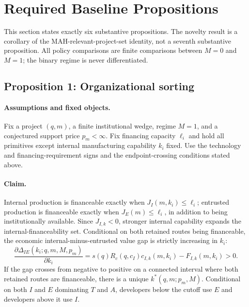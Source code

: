 \section{Required Baseline Propositions}
\label{sec:p08-propositions}

This section states exactly six substantive propositions. The novelty result
is a corollary of the MAH-relevant-project-set identity, not a seventh
substantive proposition. All policy comparisons are finite comparisons between
\(M=0\) and \(M=1\); the binary regime is never differentiated.

\subsection{Proposition 1: Organizational sorting}
\label{prop:p08-sorting}

\paragraph{Assumptions and fixed objects.}
Fix a project \((q,m)\), a finite institutional wedge, regime \(M=1\), and a
conjectured support price \(p_m<\infty\). Fix financing capacity \(\ell_i\)
and hold all primitives except internal manufacturing capability \(k_i\)
fixed. Use the technology and financing-requirement signs and the
endpoint-crossing conditions stated above.

\paragraph{Claim.}
Internal production is financeable exactly when
\(J_I(m,k_i)\leq\ell_i\); entrusted production is financeable exactly when
\(J_E(m)\leq\ell_i\), in addition to being institutionally available. Since
\(J_{I,k}<0\), stronger internal capability expands the internal-financeability
set. Conditional on both retained routes being financeable, the economic
internal-minus-entrusted value gap is strictly increasing in \(k_i\):
\begin{equation}
  \frac{\partial\Delta_{IE}(k_i;q,m,M,p_m)}{\partial k_i}
  =
  s(q)R_c(q,c_I)c_{I,k}(m,k_i)-F_{I,k}(m,k_i)
  >0.
  \label{eq:p08-sorting-slope}
\end{equation}
If the gap crosses from negative to positive on a connected interval where
both retained routes are financeable, there is a unique
\(k^*(q,m;p_m,M)\). Conditional on both \(I\) and \(E\) dominating \(T\) and
\(A\), developers below the cutoff use \(E\) and developers above it use
\(I\).

